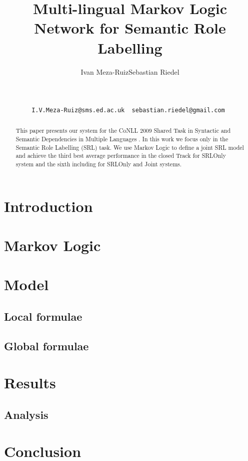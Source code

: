 \documentclass[11pt]{article}
\title{Multi-lingual Markov Logic Network for Semantic Role Labelling}
\author{
Ivan Meza-Ruiz\footnotemark[1]  \qquad Sebastian Riedel\footnotemark[2] 
\footnotemark[3]   \\
\footnotemark[1]  {School of Informatics, University of Edinburgh, UK}\\
\footnotemark[2]  {Department of Computer Science, University of Tokyo, Japan}\\
\footnotemark[3]  {Database Center for Life Science, Research Organization of 
Information and System, Japan}\\
\footnotemark[1]  \tt  I.V.Meza-Ruiz@sms.ed.ac.uk \footnotemark[2] \tt 
sebastian.riedel@gmail.com
}
\date{}
\begin{document}
 



\maketitle
\begin{abstract}
This paper presents our system for the CoNLL 2009 Shared
Task in Syntactic and Semantic Dependencies in Multiple
Languages \citep{CoNLL-2009-ST}. In this work we focus only
in the Semantic Role Labelling (SRL) task. We use Markov Logic to define a joint SRL model and achieve
the third best average performance in the closed Track for SRLOnly system and 
the sixth including for SRLOnly and Joint systems.
\end{abstract}

\section{Introduction}



\section{Markov Logic} \label{sec:markovlogic}



\section{Model} \label{sec:model} 


\subsection{Local formulae}\label{sec:local} 
 


\subsection{Global formulae}



\section{Results}\label{sec:results}



\subsection{Analysis}\label{sec:analysis}



\section{Conclusion} \label{sec:conclusion}





\end{document}
